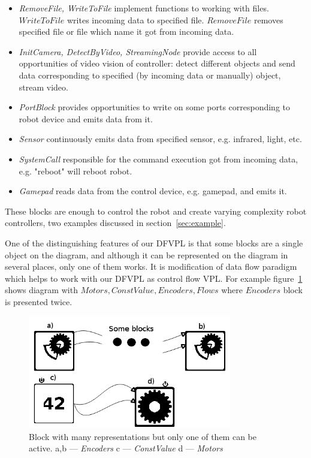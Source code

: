 \documentclass[conference,compsoc]{IEEEtran}
\begin{document}
\begin{itemize}
\begin{itemize}
\item \textit{RemoveFile, WriteToFile} implement functions to working with files. $WriteToFile$ writes incoming data to specified file. $RemoveFile$ removes specified file or file which name it got from incoming data.
\item \textit{InitCamera, DetectByVideo, StreamingNode} provide access to all opportunities of video vision of controller: detect different objects and send data corresponding to specified (by incoming data or manually) object, stream video.
\item \textit{PortBlock} provides opportunities to write on some ports corresponding to robot device and emits data from it.
\item \textit{Sensor} continuously emits data from specified sensor, e.g. infrared, light, etc.
\item \textit{SystemCall} responsible for the command execution got from incoming data, e.g. "reboot" will reboot robot.
\item \textit{Gamepad} reads data from the control device, e.g. gamepad, and emits it.
\end{itemize} 
\end{itemize} 


These blocks are enough to control the robot and create varying complexity robot controllers, two examples discussed in section~\ref{sec:example}. 

One of the distinguishing features of our DFVPL is that some blocks are a single object on the diagram, and although it can be represented on the diagram in several places, only one of them works. It is modification of data flow paradigm which helps to work with our DFVPL as control flow VPL. For example figure~\ref{image:encoder} shows diagram with $Motors, ConstValue, Encoders, Flows$ where $Encoders$ block is presented twice. 

\begin{figure}[ht]
	\centering
	\includegraphics[width=3.5in]{Encoders.png}
	\caption{Block with many representations but only one of them can be active. a,b --- \textit{Encoders} c --- \textit{ConstValue} d --- \textit{Motors}}
	\label{image:encoder}
\end{figure}
\end{document}

